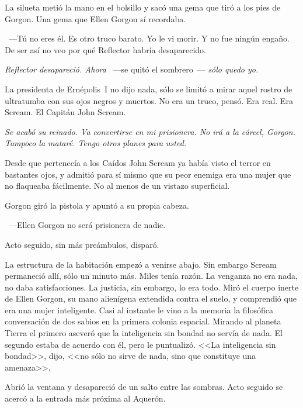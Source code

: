 La silueta metió la mano en el bolsillo y sacó una gema que tiró a los pies de Gorgon. Una gema que Ellen Gorgon sí recordaba.

~---Tú no eres él. Es otro truco barato. Yo le vi morir. Y no fue ningún engaño. De ser así no veo por qué Reflector habría desaparecido.

\emph{Reflector desapareció. Ahora} ~---se quitó el sombrero~--- \emph{sólo quedo yo.}

La presidenta de Ernépolis~I no dijo nada, sólo se limitó a mirar aquel rostro de ultratumba con sus ojos negros y muertos. No era un truco, pensó. Era real. Era Scream. El Capitán John Scream.

\emph{Se acabó su reinado. Va convertirse en mi prisionera. No irá a la cárcel, Gorgon. Tampoco la mataré. Tengo otros planes para usted.}

Desde que pertenecía a los Caídos John Scream ya había visto el terror en bastantes ojos, y admitió para sí mismo que su peor enemiga era una mujer que no flaqueaba fácilmente. No al menos de un vistazo superficial.

Gorgon giró la pistola y apuntó a su propia cabeza.

~---Ellen Gorgon no será prisionera de nadie.

Acto seguido, sin más preámbulos, disparó.

La estructura de la habitación empezó a venirse abajo. Sin embargo Scream permaneció allí, sólo un minuto más. Miles tenía razón. La venganza no era nada, no daba satisfacciones. La justicia, sin embargo, lo era todo. Miró el cuerpo inerte de Ellen Gorgon, su mano alienígena extendida contra el suelo, y comprendió que era una mujer inteligente. Casi al instante le vino a la memoria la filosófica conversación de dos sabios en la primera colonia espacial. Mirando al planeta Tierra el primero aseveró que la inteligencia sin bondad no servía de nada. El segundo estaba de acuerdo con él, pero le puntualizó. <<La inteligencia sin bondad>>, dijo, <<no sólo no sirve de nada, sino que constituye una amenaza>>.

Abrió la ventana y desapareció de un salto entre las sombras. Acto seguido se acercó a la entrada más próxima al Aquerón.

\endinput
